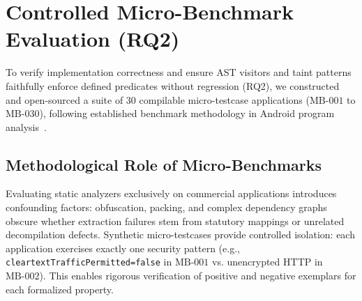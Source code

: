 \section{Controlled Micro-Benchmark Evaluation (RQ2)}
\label{sec:benchmark}

To verify implementation correctness and ensure AST visitors and taint patterns faithfully enforce defined predicates without regression (RQ2), we constructed and open-sourced a suite of 30 compilable micro-testcase applications ($\text{MB-001}$ to $\text{MB-030}$), following established benchmark methodology in Android program analysis~\cite{droidbench_suite, flowdroid}.

\subsection{Methodological Role of Micro-Benchmarks}
\label{sec:benchmark:rationale}

Evaluating static analyzers exclusively on commercial applications introduces confounding factors: obfuscation, packing, and complex dependency graphs obscure whether extraction failures stem from statutory mappings or unrelated decompilation defects. Synthetic micro-testcases provide controlled isolation: each application exercises exactly one security pattern (e.g., \texttt{cleartextTrafficPermitted=false} in $\text{MB-001}$ vs. unencrypted HTTP in $\text{MB-002}$). This enables rigorous verification of positive and negative exemplars for each formalized property.


